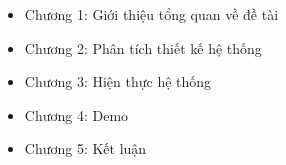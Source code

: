 
\begin{itemize}
\item Chương 1: Giới thiệu tổng quan về đề tài
\item Chương 2: Phân tích thiết kế hệ thống
\item Chương 3: Hiện thực hệ thống
\item Chương 4: Demo
\item Chương 5: Kết luận
\end{itemize}











